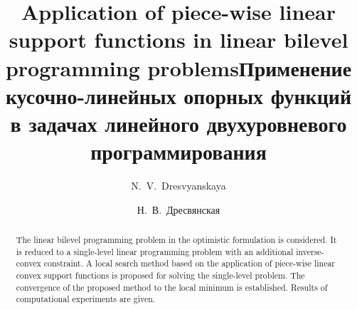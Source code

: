 \begin{englishtitle} %
\title{Application of piece-wise linear support functions in linear bilevel programming problems}
\author{N.~V.~Dresvyanskaya}


\maketitle

\begin{abstract}
The linear bilevel programming problem in the optimistic formulation is considered. 
It is reduced to a single-level linear programming problem with an additional inverse-convex constraint. 
A local search method based on the application of piece-wise linear convex support functions is proposed for solving the single-level problem. 
The convergence of the proposed method to the local minimum is established. Results of computational experiments are given.

\end{abstract}
\end{englishtitle}


\iffalse
%
%


\documentclass[12pt]{llncs}  


\usepackage{iftex}

\ifPDFTeX
\usepackage[T2A]{fontenc}
\usepackage[utf8]{inputenc} %
\usepackage[english,russian]{babel}
\fi

\usepackage{todonotes} 
\usepackage{amssymb}

\usepackage[russian]{nla}


\fi

\title{Применение кусочно-линейных опорных функций в задачах линейного двухуровневого программирования}
\author{Н.~В.~Дресвянская}

